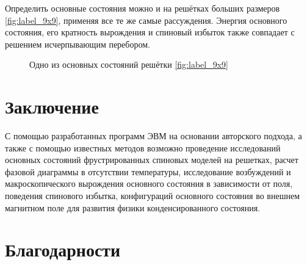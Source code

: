 \documentclass[utf8, babel, sor, jor, amsmath, amssymb, reprint]{elsarticle} %
\begin{document}
Определить основные состояния можно и на решётках больших размеров \ref{fig:label_9x9}, применяя все те же самые рассуждения. Энергия основного состояния, его кратность вырождения и спиновый избыток также совпадает с решением исчерпывающим перебором.

\begin{figure}[h]
	\centering
	\caption{Одно из основных состояний решётки \eqref{fig:label_9x9}}
	\label{fig:label_9x9_gs_1}
\end{figure}


\section{Заключение}

С помощью разработанных программ ЭВМ на основании авторского подхода, а также с помощью известных методов возможно проведение исследований основных состояний фрустрированных спиновых моделей на решетках, расчет фазовой диаграммы в отсутствии температуры, исследование возбуждений и макроскопического вырождения основного состояния в зависимости от поля, поведения спинового избытка, конфигураций основного состояния во внешнем магнитном поле для развития физики конденсированного состояния.



\section{Благодарности}

 


\end{document}
